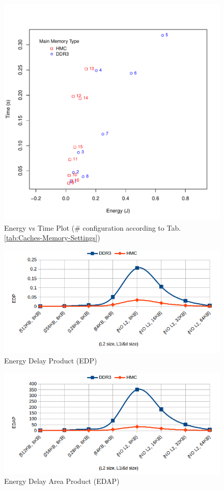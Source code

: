 \documentclass{sig-alternate-05-2015}
\begin{document}
\begin{figure}
	\centering
\includegraphics[scale=0.38]{images/graficos/Ener_Vs_Time}

\caption{\label{fig:Energy-vs-Time}Energy vs Time Plot (\# configuration according
to Tab. \ref{tab:Caches-Memory-Settings})}
\end{figure}
\begin{figure}
	\centering
\includegraphics[scale=0.38]{images/graficos/EDP_}

\caption{\label{fig:EDP}Energy Delay Product (EDP)}
\end{figure}
\begin{figure}
	\centering
\includegraphics[scale=0.38]{images/graficos/EDPA_}

\caption{\label{fig:EDAP}Energy Delay Area Product (EDAP)}
\end{figure}
\end{document}

